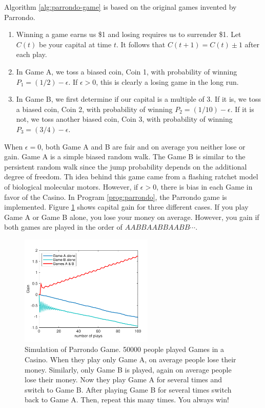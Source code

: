 Algorithm \ref{alg:parrondo-game} is based on the original games invented by Parrondo.\cite{parrondo-game}

\begin{myalgobox}

\medskip
\begin{minipage}{5.5in}
\begin{enumerate}
\item   Winning a game earns us \$1 and losing requires us to surrender \$1. Let $C(t)$ be your capital at time $t$.  It follows that $C(t+1) = C(t) \pm 1$ after each play.
\item  In Game A, we toss a biased coin, Coin 1, with probability of winning $P_1=(1/2)-\epsilon$. If $\epsilon > 0$, this is clearly a losing game in the long run.
\item   In Game B, we first determine if our capital is a multiple of 3. If it is, we toss a biased coin, Coin 2, with probability of winning $P_2=(1/10)-\epsilon$. If it is not, we toss another biased coin, Coin 3, with probability of winning $P_3=(3/4)-\epsilon$. 
\end{enumerate}
\end{minipage}
\end{myalgobox}

\bigskip
When $\epsilon=0$, both Game A and B are fair and on average you neither lose or gain.  Game A is a simple biased random walk.  The Game B is similar to the persistent random walk since the jump probability depends on the additional degree of freedom.  Th idea behind this game came from a flashing ratchet model of biological molecular motors.\cite{ratchet-sciam,ratchet-phystoday}  However, if $\epsilon>0$, there is bias in each Game in favor of the Casino. 
In Program \ref{prog:parrondo}, the Parrondo game is implemented.
Figure \ref{fig:parrondo} shows capital gain for three different cases.  If you play Game A or Game B alone, you lose your money on average.  However, you gain if both games are played in the order of $AABBAABBAABB\cdots$.

\begin{figure}
\centering
\includegraphics[width=2.5in]{16.Random-Walk/parrondo.pdf}
\caption{Simulation of Parrondo Game. 50000 people played Games in a Casino. When they play only Game A, on average people lose their money.  Similarly, only Game B is played, again on average people lose their money. Now  they play Game A for several times and switch to Game B. After playing Game B for several times switch back to Game A.  Then, repeat this many times. You always win!}
\label{fig:parrondo}
\end{figure}

